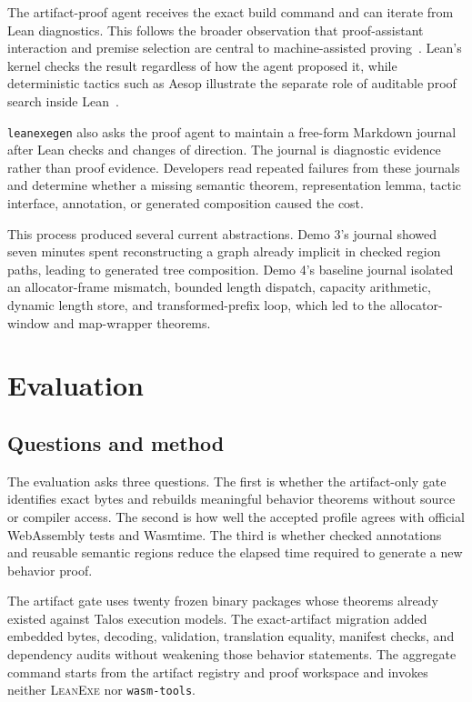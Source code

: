 \documentclass[11pt]{article}
\newcommand{\leanexe}{\textsc{LeanExe}}
\newcommand{\leanexegen}{\texttt{leanexegen}}
\newcommand{\code}[1]{\texttt{#1}}
\begin{document}
The artifact-proof agent receives the exact build command and can iterate from Lean diagnostics.  This follows the broader observation that proof-assistant interaction and premise selection are central to machine-assisted proving~\cite{Yang2023LeanDojo,Xin2024DeepSeekProver}.  Lean's kernel checks the result regardless of how the agent proposed it, while deterministic tactics such as Aesop illustrate the separate role of auditable proof search inside Lean~\cite{Limperg2023Aesop}.

\leanexegen{} also asks the proof agent to maintain a free-form Markdown journal after Lean checks and changes of direction.  The journal is diagnostic evidence rather than proof evidence.  Developers read repeated failures from these journals and determine whether a missing semantic theorem, representation lemma, tactic interface, annotation, or generated composition caused the cost.

This process produced several current abstractions.  Demo 3's journal showed seven minutes spent reconstructing a graph already implicit in checked region paths, leading to generated tree composition.  Demo 4's baseline journal isolated an allocator-frame mismatch, bounded length dispatch, capacity arithmetic, dynamic length store, and transformed-prefix loop, which led to the allocator-window and map-wrapper theorems.

\section{Evaluation}
\label{sec:evaluation}

\subsection{Questions and method}

The evaluation asks three questions.  The first is whether the artifact-only gate identifies exact bytes and rebuilds meaningful behavior theorems without source or compiler access.  The second is how well the accepted profile agrees with official WebAssembly tests and Wasmtime.  The third is whether checked annotations and reusable semantic regions reduce the elapsed time required to generate a new behavior proof.

The artifact gate uses twenty frozen binary packages whose theorems already existed against Talos execution models.  The exact-artifact migration added embedded bytes, decoding, validation, translation equality, manifest checks, and dependency audits without weakening those behavior statements.  The aggregate command starts from the artifact registry and proof workspace and invokes neither \leanexe{} nor \code{wasm-tools}.
\end{document}
